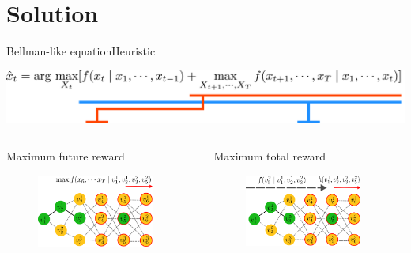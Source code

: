 \section{Solution}

\begin{frame}{Bellman-like equation}{Heuristic}
	
	
	\centering
	\includegraphics[width = \textwidth]{./figure/arg_equation}
	
	\begin{columns}
		\begin{block}{Maximum future reward}
			\begin{figure}
				\centering
				\includegraphics[width = 0.9\textwidth]{./figure/DefineFuncH}
			\end{figure}
		\end{block}
		
		\begin{block}{Maximum total reward}
			\begin{figure}
				\centering
				\includegraphics[width = 0.9\textwidth]{./figure/DefineFuncP}
			\end{figure}
		\end{block}
	\end{columns}
	

\end{frame}
